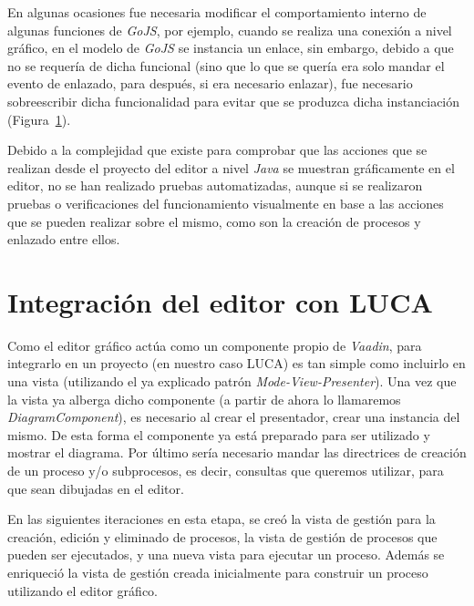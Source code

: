 En algunas ocasiones fue necesaria  modificar el comportamiento interno de algunas funciones de \emph{GoJS}, por ejemplo, cuando se realiza una conexión a nivel gráfico, en el modelo de \emph{GoJS} se instancia un enlace, sin embargo, debido a que no se requería de dicha funcional (sino que lo que se quería era solo mandar el evento de enlazado, para después, si era necesario enlazar), fue necesario sobreescribir dicha funcionalidad para evitar que se produzca dicha instanciación (Figura~\ref{}).


Debido a la complejidad que existe para comprobar que las acciones que se realizan desde el proyecto del editor a nivel \emph{Java} se muestran gráficamente en el editor, no se han realizado pruebas automatizadas, aunque si se realizaron pruebas o verificaciones del funcionamiento visualmente en base a las acciones que se pueden realizar sobre el mismo, como son la creación de procesos y enlazado entre ellos.


\section{Integración del editor con LUCA}

Como el editor gráfico actúa como un componente propio de \emph{Vaadin}, para integrarlo en un proyecto (en nuestro caso LUCA) es tan simple como incluirlo en una vista (utilizando el ya explicado patrón \emph{Mode-View-Presenter}). Una vez que la vista ya alberga dicho componente (a partir de ahora lo llamaremos \emph{DiagramComponent}), es necesario al crear el presentador, crear una instancia del mismo. De esta forma el componente ya está preparado para ser utilizado y mostrar el diagrama. Por último sería necesario mandar las directrices de creación de un proceso y/o subprocesos, es decir, consultas que queremos utilizar, para que sean dibujadas en el editor.

En las siguientes iteraciones en esta etapa, se creó la vista de gestión para la creación, edición y eliminado de procesos, la vista de gestión de procesos que pueden ser ejecutados, y una nueva vista para ejecutar un proceso. Además se enriqueció la vista de gestión creada inicialmente para construir un proceso utilizando el editor gráfico.

